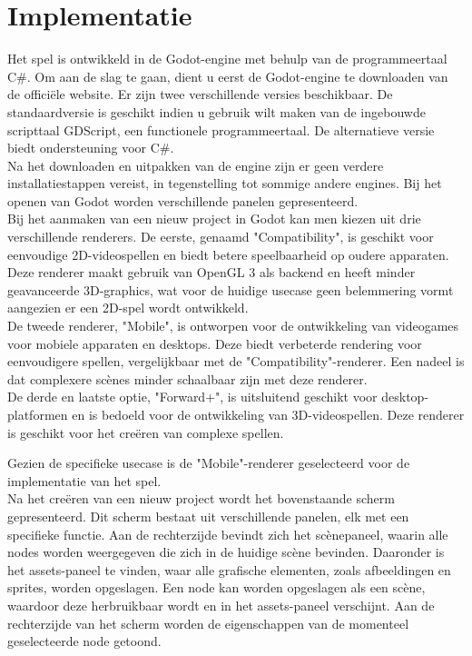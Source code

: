 \section{Implementatie}
Het spel is ontwikkeld in de Godot-engine met behulp van de programmeertaal C\#. Om aan de slag te gaan, dient u eerst de Godot-engine te downloaden van de officiële website. Er zijn twee verschillende versies beschikbaar. De standaardversie is geschikt indien u gebruik wilt maken van de ingebouwde scripttaal GDScript, een functionele programmeertaal. De alternatieve versie biedt ondersteuning voor C\#.
\\
Na het downloaden en uitpakken van de engine zijn er geen verdere installatiestappen vereist, in tegenstelling tot sommige andere engines. Bij het openen van Godot worden verschillende panelen gepresenteerd.
\\
Bij het aanmaken van een nieuw project in Godot kan men kiezen uit drie verschillende renderers. De eerste, genaamd "Compatibility", is geschikt voor eenvoudige 2D-videospellen en biedt betere speelbaarheid op oudere apparaten. Deze renderer maakt gebruik van OpenGL 3 als backend en heeft minder geavanceerde 3D-graphics, wat voor de huidige usecase geen belemmering vormt aangezien er een 2D-spel wordt ontwikkeld.
\\
De tweede renderer, "Mobile", is ontworpen voor de ontwikkeling van videogames voor mobiele apparaten en desktops. Deze biedt verbeterde rendering voor eenvoudigere spellen, vergelijkbaar met de "Compatibility"-renderer. Een nadeel is dat complexere scènes minder schaalbaar zijn met deze renderer.
\\
De derde en laatste optie, "Forward+", is uitsluitend geschikt voor desktop-platformen en is bedoeld voor de ontwikkeling van 3D-videospellen. Deze renderer is geschikt voor het creëren van complexe spellen.

Gezien de specifieke usecase is de "Mobile"-renderer geselecteerd voor de implementatie van het spel.
\\
Na het creëren van een nieuw project wordt het bovenstaande scherm gepresenteerd. Dit scherm bestaat uit verschillende panelen, elk met een specifieke functie. Aan de rechterzijde bevindt zich het scènepaneel, waarin alle nodes worden weergegeven die zich in de huidige scène bevinden. Daaronder is het assets-paneel te vinden, waar alle grafische elementen, zoals afbeeldingen en sprites, worden opgeslagen. Een node kan worden opgeslagen als een scène, waardoor deze herbruikbaar wordt en in het assets-paneel verschijnt. Aan de rechterzijde van het scherm worden de eigenschappen van de momenteel geselecteerde node getoond.


